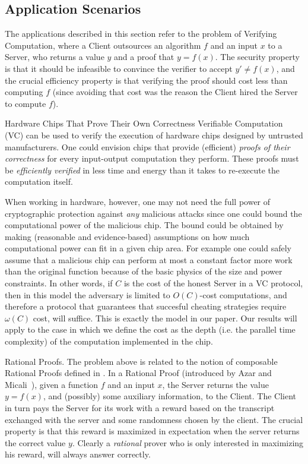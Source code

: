 \subsection{Application Scenarios}

The applications described in this section refer to the problem of Verifying Computation, where a Client outsources an algorithm $f$ and an input $x$ to a Server, who returns a value $y$ and a proof that $y=f(x)$. The security property is that it should be infeasible to convince the verifier to accept $y' \neq f(x)$, and the crucial efficiency property is that verifying the proof should cost less than computing $f$ (since avoiding that cost was the reason the Client hired the Server to compute $f$). 

\medskip
\noindent
{\sc Hardware Chips That Prove Their Own Correctness}
Verifiable Computation (VC) can be used to verify the execution of hardware chips designed by untrusted manufacturers. One could envision chips that provide (efficient) \emph{proofs of their correctness} for every input-output computation they perform. These proofs must be  \emph{efficiently verified} in less time and energy than it takes to re-execute the computation itself. 

When working in hardware, however, one may not need the full power of cryptographic protection against {\em any} malicious attacks since one could bound the computational power of the malicious chip. The bound could be obtained by making (reasonable and evidence-based) assumptions on how much computational power can fit in a given chip area. For example one could safely assume that a malicious chip can perform at most a constant factor more work than the original function because of the basic physics of the size and power constraints. In other words, if $C$ is the cost of the honest Server in a VC protocol, then in this model the adversary is limited to $O(C)$-cost computations, and therefore a protocol that guarantees that succesful cheating strategies require $\omega(C)$ cost, will suffice. This is exactly the model in our paper. Our results will apply to the case in which we define the cost as the depth (i.e. the parallel time complexity) of the computation implemented in the chip. 

\medskip
\noindent
{\sc Rational Proofs.}
The problem above is related to the notion of composable Rational Proofs defined in \cite{cg15}. In a Rational Proof (introduced by Azar and Micali~\cite{am,am1}), given a function $f$ and an input $x$, the Server returns the value $y=f(x)$, and (possibly) some auxiliary information, to the Client. The Client in turn 
pays the Server for its work with a reward based on the transcript exchanged with the server and some randomness chosen by the client.  The crucial 
property is that this reward is maximized in expectation when the server 
returns the correct value $y$. Clearly a {\em rational} prover who is only interested 
in maximizing his reward, will always answer correctly. 

